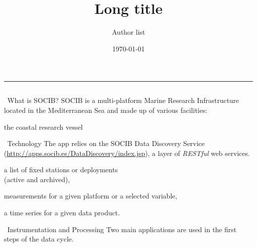\documentclass[final]{beamer}
\title[Short title]{Long title}
\author{Author list}
\institute{SOCIB, IMEDEA}
\date{\today}
\begin{document}
\begin{frame}{} 
\justifying
\rule{\columnwidth}{.2cm}
  
\begin{columns}[T]
  
\begin{column}{.32\linewidth}
    
    
\begin{block}{~What is SOCIB?}
\justifying
SOCIB is a multi-platform  Marine Research Infrastructure located in the Mediterranean Sea and made up of various facilities:
\begin{enumline}
\item the coastal research vessel
\end{enumline}

\end{block}

\sepblock

\begin{block}{~Technology}
\justifying
The app relies on the SOCIB Data Discovery Service (\url{http://apps.socib.es/DataDiscovery/index.jsp}), a layer of \textit{RESTful} web services.


\begin{itemline}
\item a list of fixed stations or deployments\\ (active and archived),
\item measurements for a given platform or a selected variable,
\item a time series for a given data product.
\end{itemline}

\end{block}

\sepblocksub

\begin{block}{~Instrumentation and Processing}
\justifying
Two main applications are used in the first steps of the data cycle.
\end{block}

\sepblock


\end{column}



\end{columns}
\end{frame}
\end{document}

